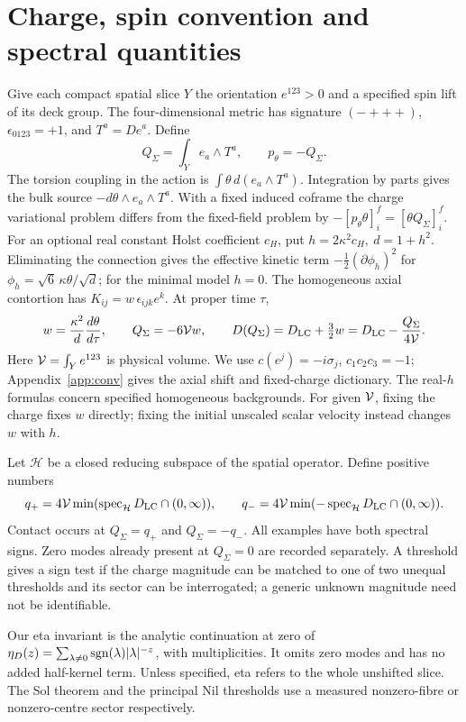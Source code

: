 \section{Charge, spin convention and spectral quantities}\label{sec:setting}
Give each compact spatial slice \(Y\) the orientation \(e^{123}>0\) and a specified spin lift of its deck group. The four-dimensional metric has signature \((-+++)\), \(\epsilon_{0123}=+1\), and \(T^a=De^a\). Define
\[
 Q_\Sigma=\int_Y e_a\wedge T^a,\qquad p_\theta=-Q_\Sigma .
\]
The torsion coupling in the action is \(\int\theta\,d(e_a\wedge T^a)\). Integration by parts gives the bulk source \(-d\theta\wedge e_a\wedge T^a\). With a fixed induced coframe the charge variational problem differs from the fixed-field problem by \(-[p_\theta\theta]_i^f=[\theta Q_\Sigma]_i^f\). For an optional real constant Holst coefficient \(c_H\), put \(h=2\kappa^2 c_H,\ d=1+h^2\). Eliminating the connection gives the effective kinetic term \(-\tfrac12(\partial\phi_h)^2\) for \(\phi_h=\sqrt6\,\kappa\theta/\sqrt d\); for the minimal model \(h=0\). The homogeneous axial contortion has \(K_{ij}=w\,\epsilon_{ijk}e^k\). At proper time \(\tau\),
\begin{equation}
 w=\frac{\kappa^2}{d}\frac{d\theta}{d\tau},\qquad
 Q_\Sigma=-6\mathcal V w,\qquad
 D(Q_\Sigma)=D_{\mathrm{LC}}+\tfrac32 w=D_{\mathrm{LC}}-\frac{Q_\Sigma}{4\mathcal V}.
 \label{eq:shift}
\end{equation}
Here \(\mathcal V=\int_Y e^{123}\) is physical volume. We use \(c(e^j)=-i\sigma_j\), \(c_1c_2c_3=-1\); Appendix~\ref{app:conv} gives the axial shift and fixed-charge dictionary. The real-\(h\) formulas concern specified homogeneous backgrounds. For given \(\mathcal V\), fixing the charge fixes \(w\) directly; fixing the initial unscaled scalar velocity instead changes \(w\) with \(h\).

Let \(\mathcal H\) be a closed reducing subspace of the spatial operator. Define positive numbers
\begin{equation}
 q_+=4\mathcal V\min(\operatorname{spec}_{\mathcal H}D_{\mathrm{LC}}\cap(0,\infty)),\qquad
 q_-=4\mathcal V\min(-\operatorname{spec}_{\mathcal H}D_{\mathrm{LC}}\cap(0,\infty)).
 \label{eq:gaps}
\end{equation}
Contact occurs at \(Q_\Sigma=q_+\) and \(Q_\Sigma=-q_-\). All examples have both spectral signs. Zero modes already present at \(Q_\Sigma=0\) are recorded separately. A threshold gives a sign test if the charge magnitude can be matched to one of two unequal thresholds and its sector can be interrogated; a generic unknown magnitude need not be identifiable.

Our eta invariant is the analytic continuation at zero of
\(\eta_D(z)=\sum_{\lambda\ne0}\operatorname{sgn}(\lambda)|\lambda|^{-z}\), with multiplicities. It omits zero modes and has no added half-kernel term. Unless specified, eta refers to the whole unshifted slice. The Sol theorem and the principal Nil thresholds use a measured nonzero-fibre or nonzero-centre sector respectively.

